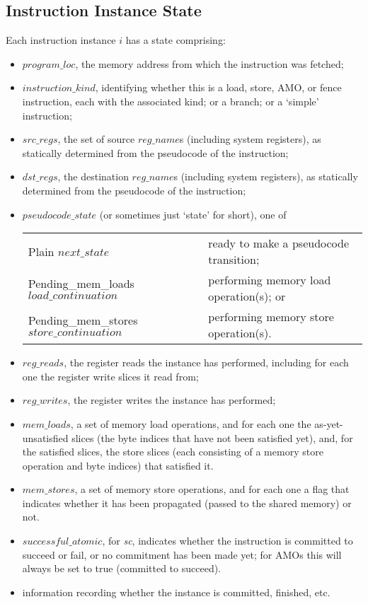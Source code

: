 \subsection{Instruction Instance State}\label{sec:omm:inst_state}
Each instruction instance $i$ has a state comprising:
\begin{itemize}
\item $program\_loc$, the memory address from which the instruction was fetched;
\item $instruction\_kind$, identifying whether this is a load, store, AMO, or fence instruction, each with the associated kind; or a branch; or a `simple' instruction;
\item $src\_regs$, the set of source $reg\_name$s (including system registers), as statically determined from the pseudocode of the instruction;
\item $dst\_regs$, the destination $reg\_name$s (including system registers), as statically determined from the pseudocode of the instruction;
\item $pseudocode\_state$ (or sometimes just `state' for short), one of
  \begin{center}
  \begin{tabular}{l@{ - }l}
  {\sc Plain} $next\_state$                        & ready to make a pseudocode transition; \\
  {\sc Pending\_mem\_loads} $load\_continuation$   & performing memory load operation(s); or \\
  {\sc Pending\_mem\_stores} $store\_continuation$ & performing memory store operation(s). \\
  \end{tabular}
  \end{center}
\item $reg\_reads$, the register reads the instance has performed, including for each one the register write slices it read from;
\item $reg\_writes$, the register writes the instance has performed;
\item $mem\_loads$, a set of memory load operations, and for each one the as-yet-unsatisfied slices (the byte indices that have not been satisfied yet), and, for the satisfied slices, the store slices (each consisting of a memory store operation and byte indices) that satisfied it.
\item $mem\_stores$, a set of memory store operations, and for each one a flag that indicates whether it has been propagated (passed to the shared memory) or not.
\item $successful\_atomic$, for {\em sc}, indicates whether the instruction is committed to succeed or fail, or no commitment has been made yet; for AMOs this will always be set to true (committed to succeed).
\item information recording whether the instance is committed, finished, etc.
\end{itemize}

